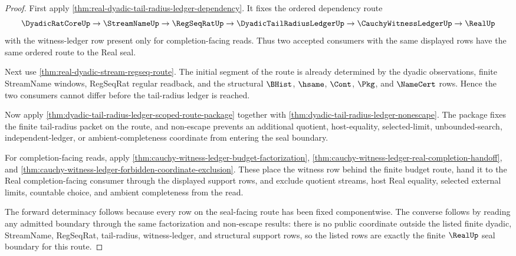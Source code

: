 \begin{proof}
First apply \autoref{thm:real-dyadic-tail-radius-ledger-dependency}. It fixes
the ordered dependency route
$$
\DyadicRatCoreUp \to \StreamNameUp \to \RegSeqRatUp
\to \DyadicTailRadiusLedgerUp \to \CauchyWitnessLedgerUp \to \RealUp
$$
with the witness-ledger row present only for completion-facing reads. Thus two
accepted consumers with the same displayed rows have the same ordered route to
the Real seal.

Next use \autoref{thm:real-dyadic-stream-regseq-route}. The initial segment of
the route is already determined by the dyadic observations, finite StreamName
windows, RegSeqRat regular readback, and the structural $\BHist$, $\hsame$,
$\Cont$, $\Pkg$, and $\NameCert$ rows. Hence the two consumers cannot differ
before the tail-radius ledger is reached.

Now apply \autoref{thm:dyadic-tail-radius-ledger-scoped-route-package} together
with \autoref{thm:dyadic-tail-radius-ledger-nonescape}. The package fixes the
finite tail-radius packet on the route, and non-escape prevents an additional
quotient, host-equality, selected-limit, unbounded-search, independent-ledger,
or ambient-completeness coordinate from entering the seal boundary.

For completion-facing reads, apply
\autoref{thm:cauchy-witness-ledger-budget-factorization},
\autoref{thm:cauchy-witness-ledger-real-completion-handoff}, and
\autoref{thm:cauchy-witness-ledger-forbidden-coordinate-exclusion}. These
place the witness row behind the finite budget route, hand it to the Real
completion-facing consumer through the displayed support rows, and exclude
quotient streams, host Real equality, selected external limits, countable
choice, and ambient completeness from the read.

The forward determinacy follows because every row on the seal-facing route has
been fixed componentwise. The converse follows by reading any admitted boundary
through the same factorization and non-escape results: there is no public
coordinate outside the listed finite dyadic, StreamName, RegSeqRat,
tail-radius, witness-ledger, and structural support rows, so the listed rows
are exactly the finite $\RealUp$ seal boundary for this route.
\end{proof}
